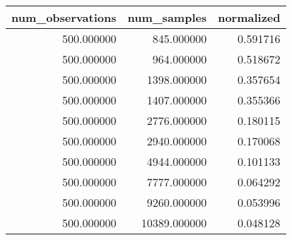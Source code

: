 \begin{tabular}{rrr}
\toprule
num\_observations & num\_samples & normalized \\
\midrule
500.000000 & 845.000000 & 0.591716 \\
500.000000 & 964.000000 & 0.518672 \\
500.000000 & 1398.000000 & 0.357654 \\
500.000000 & 1407.000000 & 0.355366 \\
500.000000 & 2776.000000 & 0.180115 \\
500.000000 & 2940.000000 & 0.170068 \\
500.000000 & 4944.000000 & 0.101133 \\
500.000000 & 7777.000000 & 0.064292 \\
500.000000 & 9260.000000 & 0.053996 \\
500.000000 & 10389.000000 & 0.048128 \\
\bottomrule
\end{tabular}
